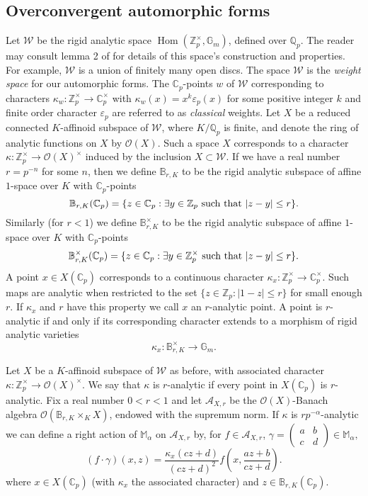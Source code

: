 \documentclass[a4paper, notitlepage]{amsart}
\newcommand{\Z}{\ensuremath{\mathbb{Z}}\xspace}
\newcommand{\Q}{\ensuremath{\mathbb{Q}}\xspace}
\newcommand{\C}{\ensuremath{\mathbb{C}}\xspace}
\newcommand{\OO}{\ensuremath{\mathscr{O}}\xspace}
\DeclareMathOperator{\Hom}{Hom}
\begin{document}
\subsection{Overconvergent automorphic forms}\label{ocforms}

Let $\mathscr{W}$ be the rigid analytic space $\Hom(\Z_p^\times, \mathbb{G}_m)$, defined over $\Q_p$. The reader may consult lemma 2 of \cite{Bu1} for details of this space's construction and properties. For example, $\mathscr{W}$ is a union of finitely many open discs. The space $\mathscr{W}$ is the \emph{weight space} for our automorphic forms. The $\C_p$-points $w$ of $\mathscr{W}$ corresponding to characters $\kappa_w: \Z_p^\times \rightarrow \C_p^\times$ with $\kappa_w(x)=x^k \varepsilon_p(x)$ for some positive integer $k$ and  finite order character $\varepsilon_p$ are referred to as \emph{classical} weights. Let $X$ be a reduced connected $K$-affinoid subspace of $\mathscr{W}$, where $K/\Q_p$ is finite, and denote the ring of analytic functions on $X$ by $\OO(X)$. Such a space $X$ corresponds to a character $\kappa: \Z_p^\times \rightarrow \OO(X)^\times$ induced by the inclusion $X \subset \mathscr{W}$. If we have a real number $r=p^{-n}$ for some $n$, then we define $\mathbb{B}_{r,K}$ to be the rigid analytic subspace of affine $1$-space over $K$ with $\C_p$-points $$\mathbb{B}_{r,K}(\C_p)=\{z \in \C_p: \exists y\in \Z_p \hbox{ such that } |z-y|\leq r\}.$$ Similarly (for $r < 1$) we define $\mathbb{B}_{r,K}^\times$ to be the rigid analytic subspace of affine $1$-space over $K$ with $\C_p$-points $$\mathbb{B}_{r,K}^\times(\C_p)=\{z \in \C_p: \exists y\in \Z_p^\times \hbox{ such that } |z-y|\leq r\}.$$
A point $x \in X(\C_p)$ corresponds to a continuous character $\kappa_x :\Z_p^\times \rightarrow \C_p^\times$. Such maps are analytic when restricted to the set $\{z \in \Z_p : |1-z| \le r \}$ for small enough $r$. If $\kappa_x$ and $r$ have this property we call $x$ an $r$-analytic point. A point is $r$-analytic if and only if its corresponding character extends to a morphism of rigid analytic varieties $$\kappa_x:\mathbb{B}_{r,K}^\times \rightarrow \mathbb{G}_m.$$ 

Let $X$ be a $K$-affinoid subspace of $\mathscr{W}$ as before, with associated character $\kappa: \Z_p^\times \rightarrow \OO(X)^\times$. We say that $\kappa$ is $r$-analytic if every point in $X(\C_p)$ is $r$-analytic. Fix a real number $0 < r < 1$ and let $\mathscr{A}_{X,r}$ be the $\OO(X)$-Banach algebra $\OO(\mathbb{B}_{r,K} \times_K X)$, endowed with the supremum norm. If $\kappa$ is $rp^{-\alpha}$-analytic we can define a right action of $\mathbb{M}_\alpha$ on $\mathscr{A}_{X,r}$ by, for $f \in \mathscr{A}_{X,r}$, $\gamma = \begin{pmatrix}
a&b\\
c&d
\end{pmatrix} \in \mathbb{M}_\alpha ,$
$$(f\cdot \gamma)(x,z)=\frac{\kappa_x(cz+d)}{(cz+d)^2}f\left (x,\frac{az+b}{cz+d}\right ).$$ where $x \in X(\C_p)$ (with $\kappa_x$ the associated character) and $z \in \mathbb{B}_{r,K}(\C_p)$.
\end{document}

